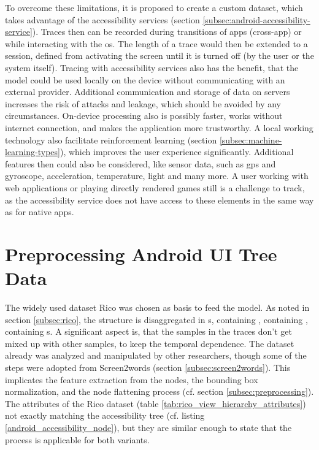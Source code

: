 To overcome these limitations, it is proposed to create a custom dataset, which takes advantage of the accessibility services (section \ref{subsec:android-accessibility-service}).
Traces then can be recorded during transitions of apps (cross-app) or while interacting with the \gls{os}.
The length of a trace would then be extended to a session, defined from activating the screen until it is turned off (by the user or the system itself).
Tracing with accessibility services also has the benefit, that the model could be used locally on the device without communicating with an external provider.
Additional communication and storage of data on servers increases the risk of attacks and leakage, which should be avoided by any circumstances.
On-device processing also is possibly faster, works without internet connection, and makes the application more trustworthy.
A local working technology also facilitate reinforcement learning (section \ref{subsec:machine-learning-types}), which improves the user experience significantly.
Additional features then could also be considered, like sensor data, such as \gls{gps} and gyroscope, acceleration, temperature, light and many more.
A user working with web applications or playing directly rendered games still is a challenge to track, as the accessibility service does not have access to these elements in the same way as for native apps.


\section{Preprocessing Android UI Tree Data}

The widely used dataset Rico was chosen as basis to feed the model.
As noted in section \ref{subsec:rico}, the structure is disaggregated in s, containing , containing , containing s.
A significant aspect is, that the samples in the traces don't get mixed up with other samples, to keep the temporal dependence.
The dataset already was analyzed and manipulated by other researchers, though some of the steps were adopted from Screen2words (section \ref{subsec:screen2words}).
This implicates the feature extraction from the nodes, the bounding box normalization, and the node flattening process (cf. section \ref{subsec:preprocessing}).
The attributes of the Rico dataset (table \ref{tab:rico_view_hierarchy_attributes}) not exactly matching the accessibility tree (cf. listing \ref{android_accessibility_node}), but they are similar enough to state that the process is applicable for both variants.

